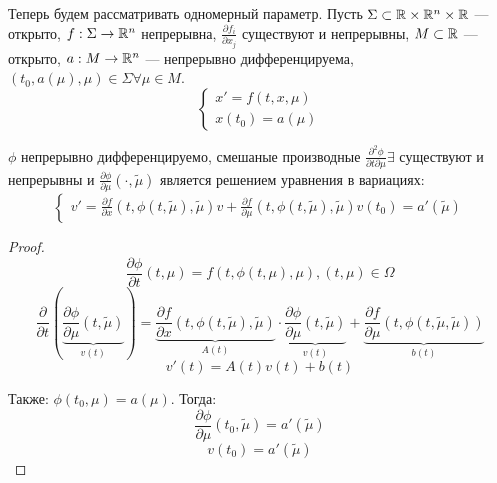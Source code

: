 Теперь будем рассматривать одномерный параметр. Пусть \(\Sigma \subset \mathbb{R} \times \mathbb{R}^n \times \mathbb{R}\) --- открыто, \(f: \Sigma \rightarrow \mathbb{R}^n\) непрерывна, \(\frac{\partial f_i}{\partial x_j}\) существуют и непрерывны, \(M \subset \mathbb{R}\) --- открыто, \(a: M \rightarrow \mathbb{R}^n\) --- непрерывно дифференцируема, \((t_0, a(\mu), \mu) \in \Sigma \forall \mu \in M\).
\begin{equation}
    \begin{cases}
        x' = f(t, x, \mu) \\
        x(t_0) = a(\mu)
    \end{cases}
\end{equation}

\begin{theorem}
    \(\phi\) непрерывно дифференцируемо, смешаные производные \(\frac{\partial^2 \phi}{\partial t \partial \mu} \exists\) существуют и непрерывны и \(\frac{\partial \phi}{\partial \mu}(\cdot, \tilde{\mu})\) является решением уравнения в вариациях:
    \begin{equation}
        \begin{cases}
            v' = \frac{\partial f}{\partial x}(t, \phi(t, \tilde{\mu}), \tilde{\mu})v + \frac{\partial f}{\partial \mu}(t, \phi(t, \tilde{\mu}), \tilde{\mu})
            v(t_0) = a'(\tilde{\mu})
        \end{cases}
    \end{equation} 
\end{theorem}
\begin{proof}
    \[\frac{\partial \phi}{\partial t}(t, \mu) = f(t, \phi(t, \mu), \mu), (t, \mu) \in \Omega\]
    \[\frac{\partial}{\partial t}\left( \underbrace{\frac{\partial \phi}{\partial \mu}(t, \tilde{\mu})}_{v(t)} \right) = \underbrace{\frac{\partial f}{\partial x}(t, \phi(t, \tilde{\mu}), \tilde{\mu})}_{A(t)}\cdot \underbrace{\frac{\partial \phi}{\partial \mu}(t, \tilde{\mu})}_{v(t)} + \underbrace{\frac{\partial f}{\partial \mu}(t, \phi(t, \tilde{\mu}, \tilde{\mu}))}_{b(t)}\]
    \[v'(t) = A(t)v(t) + b(t)\]

    Также: \(\phi(t_0, \mu) = a(\mu)\). Тогда: 
    \[\frac{\partial \phi}{\partial \mu}(t_0, \tilde{\mu}) = a'(\tilde{\mu})\]
    \[v(t_0) = a'(\tilde{\mu})\]
\end{proof}
